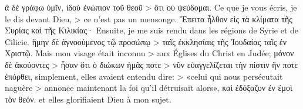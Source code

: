 \documentclass[14pt,a4paper,twoside]{extarticle}
\begin{document}
\begin{paracol}[1]
  \verset
  {ἃ δὲ γράφω ὑμῖν, ἰδοὺ ἐνώπιον τοῦ θεοῦ
    > ὅτι οὐ ψεύδομαι.}
  {Ce que je vous écris, je le dis devant Dieu,
    > ce n’est pas un mensonge.}
  \verset
  {Ἔπειτα ἦλθον εἰς τὰ κλίματα τῆς Συρίας καὶ τῆς Κιλικίας·}
  {Ensuite, je me suis rendu dans les régions de Syrie et de Cilicie.}
  \verset
  {ἤμην δὲ ἀγνοούμενος τῷ προσώπῳ
    > ταῖς ἐκκλησίαις τῆς Ἰουδαίας ταῖς ἐν Χριστῷ.}
  {Mais mon visage était inconnu
    > aux Églises du Christ en Judée;}
  \verset
  {μόνον δὲ ἀκούοντες
    > ἦσαν ὅτι ὁ διώκων ἡμᾶς ποτε
    > νῦν εὐαγγελίζεται τὴν πίστιν ἥν ποτε ἐπόρθει,}
  {simplement, elles avaient entendu dire:
    > «celui qui nous persécutait naguère
    > annonce maintenant la foi qu’il détruisait alors»,}
  \verset
  {καὶ ἐδόξαζον ἐν ἐμοὶ τὸν θεόν.}
  {et elles glorifiaient Dieu à mon sujet.}


\end{paracol}
\end{document}
